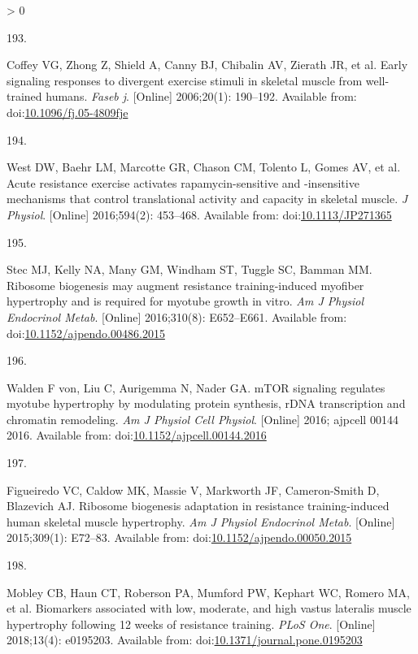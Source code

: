 \documentclass[twoside,10pt]{gihclass} %
\newlength{\cslhangindent}
\newlength{\csllabelwidth}
\newenvironment{CSLReferences}[3] %
 {%
  \setlength{\parindent}{0pt}
  \ifodd #1 \everypar{\setlength{\hangindent}{\cslhangindent}}\ignorespaces\fi
  \ifnum #2 > 0
  \setlength{\parskip}{#2\baselineskip}
  \fi
 }%
 {}
\newcommand{\CSLLeftMargin}[1]{\parbox[t]{\maxof{\widthof{#1}}{\csllabelwidth}}{#1}}
\newcommand{\CSLRightInline}[1]{\parbox[t]{\linewidth}{#1}}
\begin{document}
\begin{CSLReferences}{0}{0}
\leavevmode\hypertarget{ref-RN1871}{}%
\CSLLeftMargin{193. }
\CSLRightInline{Coffey VG, Zhong Z, Shield A, Canny BJ, Chibalin AV, Zierath JR, et al. Early signaling responses to divergent exercise stimuli in skeletal muscle from well-trained humans. \emph{Faseb j}. {[}Online{]} 2006;20(1): 190--192. Available from: doi:\href{https://doi.org/10.1096/fj.05-4809fje}{10.1096/fj.05-4809fje}}

\leavevmode\hypertarget{ref-RN1754}{}%
\CSLLeftMargin{194. }
\CSLRightInline{West DW, Baehr LM, Marcotte GR, Chason CM, Tolento L, Gomes AV, et al. Acute resistance exercise activates rapamycin-sensitive and -insensitive mechanisms that control translational activity and capacity in skeletal muscle. \emph{J Physiol}. {[}Online{]} 2016;594(2): 453--468. Available from: doi:\href{https://doi.org/10.1113/JP271365}{10.1113/JP271365}}

\leavevmode\hypertarget{ref-RN1755}{}%
\CSLLeftMargin{195. }
\CSLRightInline{Stec MJ, Kelly NA, Many GM, Windham ST, Tuggle SC, Bamman MM. Ribosome biogenesis may augment resistance training-induced myofiber hypertrophy and is required for myotube growth in vitro. \emph{Am J Physiol Endocrinol Metab}. {[}Online{]} 2016;310(8): E652--E661. Available from: doi:\href{https://doi.org/10.1152/ajpendo.00486.2015}{10.1152/ajpendo.00486.2015}}

\leavevmode\hypertarget{ref-RN1810}{}%
\CSLLeftMargin{196. }
\CSLRightInline{Walden F von, Liu C, Aurigemma N, Nader GA. mTOR signaling regulates myotube hypertrophy by modulating protein synthesis, rDNA transcription and chromatin remodeling. \emph{Am J Physiol Cell Physiol}. {[}Online{]} 2016; ajpcell 00144 2016. Available from: doi:\href{https://doi.org/10.1152/ajpcell.00144.2016}{10.1152/ajpcell.00144.2016}}

\leavevmode\hypertarget{ref-RN1644}{}%
\CSLLeftMargin{197. }
\CSLRightInline{Figueiredo VC, Caldow MK, Massie V, Markworth JF, Cameron-Smith D, Blazevich AJ. Ribosome biogenesis adaptation in resistance training-induced human skeletal muscle hypertrophy. \emph{Am J Physiol Endocrinol Metab}. {[}Online{]} 2015;309(1): E72--83. Available from: doi:\href{https://doi.org/10.1152/ajpendo.00050.2015}{10.1152/ajpendo.00050.2015}}

\leavevmode\hypertarget{ref-RN2055}{}%
\CSLLeftMargin{198. }
\CSLRightInline{Mobley CB, Haun CT, Roberson PA, Mumford PW, Kephart WC, Romero MA, et al. Biomarkers associated with low, moderate, and high vastus lateralis muscle hypertrophy following 12 weeks of resistance training. \emph{PLoS One}. {[}Online{]} 2018;13(4): e0195203. Available from: doi:\href{https://doi.org/10.1371/journal.pone.0195203}{10.1371/journal.pone.0195203}}


\end{CSLReferences}
\end{document}
